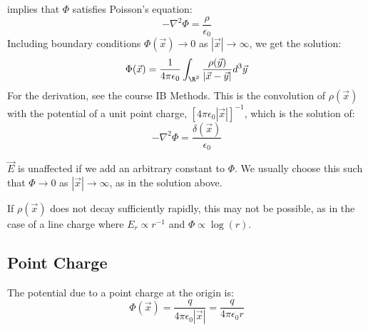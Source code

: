 \documentclass[../Main.tex]{subfiles}
\begin{document}
 implies that $\Phi$ satisfies Poisson's equation:
\begin{equation*}
    -\nabla^2 \Phi = \frac{\rho}{\epsilon_0}
\end{equation*}
Including boundary conditions $\Phi(\vec{x}) \to 0$ as $|\vec{x}| \to \infty$, we get the solution:
\begin{equation}
    \Phi(\vec{x}) = \frac{1}{4\pi \epsilon_0} \int_{\R^3} \frac{\rho(\vec{y})}{|\vec{x} - \vec{y}|} d^3 \vec{y}
    \label{eqnPoissonIntegralSoln}
\end{equation}
For the derivation, see the course IB Methods. This is the convolution of $\rho(\vec{x})$ with the potential of a unit point charge, $[4\pi \epsilon_0 |\vec{x}|]^{-1}$, which is the solution of:
\begin{equation*}
    -\nabla^2 \Phi = \frac{\delta(\vec{x})}{\epsilon_0}
\end{equation*}
\begin{remark}
    $\vec{E}$ is unaffected if we add an arbitrary constant to $\Phi$. We usually choose this such that $\Phi \to 0$ as $|\vec{x}| \to \infty$, as in the solution above.

    If $\rho(\vec{x})$ does not decay sufficiently rapidly, this may not be possible, as in the case of a line charge where $E_r \propto r^{-1}$ and $\Phi \propto \log(r)$.
\end{remark}
\subsection{Point Charge}
The potential due to a point charge at the origin is:
\begin{equation*}
    \Phi(\vec{x}) = \frac{q}{4\pi \epsilon_0 |\vec{x}|} = \frac{q}{4 \pi \epsilon_0 r}
\end{equation*}
\end{document}
